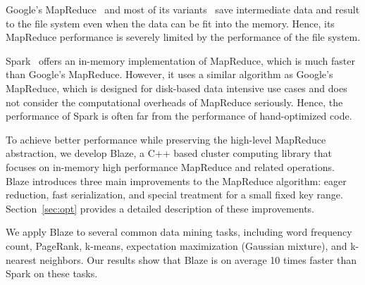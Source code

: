 Google's MapReduce~\cite{dean2008mapreduce,dean2010mapreduce} and most of its variants~\cite{hadoop,chambers2010flumejava,cascading,afrati2010optimizing,bhatotia2011incoop,condie2010mapreduce,ekanayake2010twister,goiri2015approxhadoop,he2008mars,li2015coded,zaharia2008improving,yang2007map} save intermediate data and result to the file system even when the data can be fit into the memory.
Hence, its MapReduce performance is severely limited by the performance of the file system.

Spark~\cite{spark, zaharia2010spark, zaharia2016apache, zaharia2012resilient} offers an in-memory implementation of MapReduce, which is much faster than Google's MapReduce.
However, it uses a similar algorithm as Google's MapReduce, which is designed for disk-based data intensive use cases and does not consider the computational overheads of MapReduce seriously.
Hence, the performance of Spark is often far from the performance of hand-optimized code.

To achieve better performance while preserving the high-level MapReduce abstraction, we develop Blaze, a C++ based cluster computing library that focuses on in-memory high performance MapReduce and related operations.
Blaze introduces three main improvements to the MapReduce algorithm: eager reduction, fast serialization, and special treatment for a small fixed key range.
Section~\ref{sec:opt} provides a detailed description of these improvements.





We apply Blaze to several common data mining tasks, including word frequency count, PageRank, k-means, expectation maximization (Gaussian mixture), and k-nearest neighbors.
Our results show that Blaze is on average 10 times faster than Spark on these tasks.

